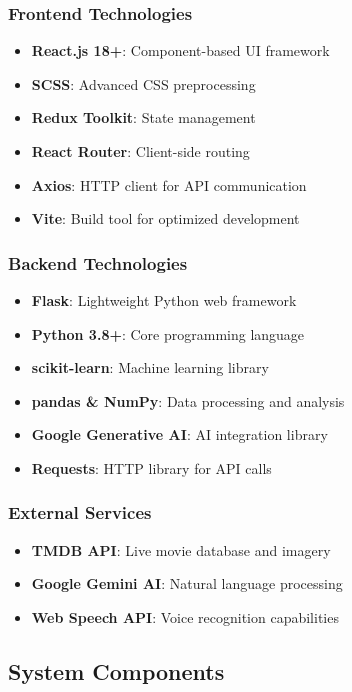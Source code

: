 \documentclass[12pt,a4paper]{article}
\begin{document}
\subsubsection{Frontend Technologies}
\begin{itemize}
    \item \textbf{React.js 18+}: Component-based UI framework
    \item \textbf{SCSS}: Advanced CSS preprocessing
    \item \textbf{Redux Toolkit}: State management
    \item \textbf{React Router}: Client-side routing
    \item \textbf{Axios}: HTTP client for API communication
    \item \textbf{Vite}: Build tool for optimized development
\end{itemize}

\subsubsection{Backend Technologies}
\begin{itemize}
    \item \textbf{Flask}: Lightweight Python web framework
    \item \textbf{Python 3.8+}: Core programming language
    \item \textbf{scikit-learn}: Machine learning library
    \item \textbf{pandas \& NumPy}: Data processing and analysis
    \item \textbf{Google Generative AI}: AI integration library
    \item \textbf{Requests}: HTTP library for API calls
\end{itemize}

\subsubsection{External Services}
\begin{itemize}
    \item \textbf{TMDB API}: Live movie database and imagery
    \item \textbf{Google Gemini AI}: Natural language processing
    \item \textbf{Web Speech API}: Voice recognition capabilities
\end{itemize}

\subsection{System Components}
\end{document}
